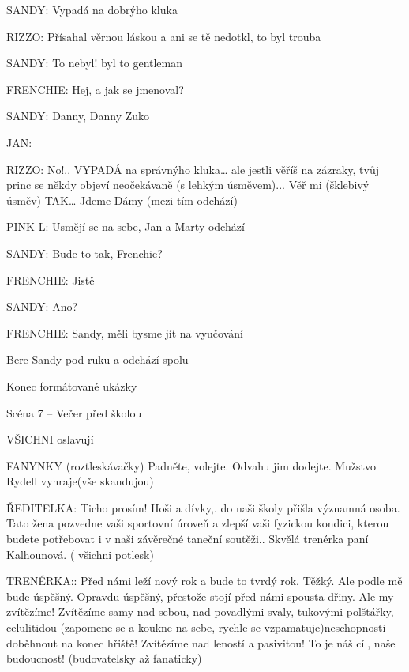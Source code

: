 \rep SANDY:                 Vypadá na dobrýho kluka

\rep RIZZO:        Přísahal věrnou láskou a ani se tě nedotkl, to byl trouba

\rep SANDY:        To nebyl! byl to gentleman

\rep FRENCHIE:        Hej, a jak se jmenoval?

\rep SANDY:        Danny, Danny Zuko 

\rep JAN:         

\rep RIZZO:        No!.. VYPADÁ na správnýho kluka… ale jestli věříš na zázraky, tvůj princ         se někdy objeví neočekávaně (s lehkým úsměvem)... Věř mi (šklebivý         úsměv) TAK… Jdeme Dámy (mezi tím odchází)

\rep PINK L:         Usmějí se na sebe, Jan a Marty odchází

\rep SANDY:        Bude to tak, Frenchie?

\rep FRENCHIE:        Jistě 

\rep SANDY:        Ano? 

\rep FRENCHIE:        Sandy, měli bysme jít na vyučování 

\pop Bere Sandy pod ruku a         odchází spolu













Konec formátované ukázky

\bye


Scéna 7 – Večer před školou

VŠICHNI                         oslavují 

      FANYNKY (roztleskávačky) Padněte, volejte. Odvahu jim dodejte. Mužstvo Rydell                                vyhraje(vše skandujou)

\rep ŘEDITELKA:         Ticho prosím! Hoši a dívky,. do naši školy přišla významná osoba.                  Tato žena pozvedne vaši sportovní úroveň a zlepší vaši fyzickou kondici,         kterou budete potřebovat i v naši závěrečné taneční soutěži.. Skvělá         trenérka paní Kalhounová. ( všichni potlesk)

TRENÉRKA::         Před námi leží nový rok a bude to tvrdý rok. Těžký. Ale podle mě bude         úspěšný. Opravdu úspěšný, přestože stojí před námi spousta dřiny.  Ale         my zvítězíme! Zvítězíme samy nad sebou, nad povadlými svaly,                 tukovými polštářky, celulitidou (zapomene se a koukne na sebe, rychle         se vzpamatuje)neschopnosti doběhnout na konec hřiště! Zvítězíme nad         leností a pasivitou!  To je náš cíl, naše budoucnost! (budovatelsky až         fanaticky)    

